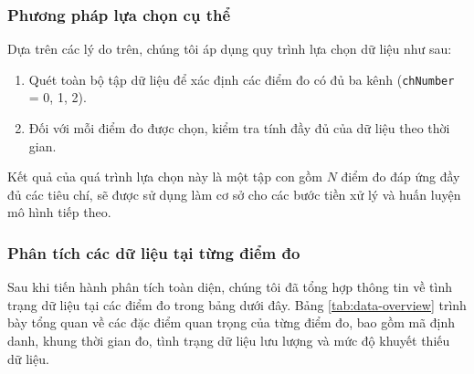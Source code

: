 \subsubsection{Phương pháp lựa chọn cụ thể}
Dựa trên các lý do trên, chúng tôi áp dụng quy trình lựa chọn dữ liệu như sau:

\begin{enumerate}
    \item Quét toàn bộ tập dữ liệu để xác định các điểm đo có đủ ba kênh (\texttt{chNumber} = 0, 1, 2).
    \item Đối với mỗi điểm đo được chọn, kiểm tra tính đầy đủ của dữ liệu theo thời gian.
\end{enumerate}

Kết quả của quá trình lựa chọn này là một tập con gồm $N$ điểm đo đáp ứng đầy đủ các tiêu chí, sẽ được sử dụng làm cơ sở cho các bước tiền xử lý và huấn luyện mô hình tiếp theo.
\subsubsection{Phân tích các dữ liệu tại từng điểm đo}
Sau khi tiến hành phân tích toàn diện, chúng tôi đã tổng hợp thông tin về tình trạng dữ liệu tại các điểm đo trong bảng dưới đây. Bảng \ref{tab:data-overview} trình bày tổng quan về các đặc điểm quan trọng của từng điểm đo, bao gồm mã định danh, khung thời gian đo, tình trạng dữ liệu lưu lượng và mức độ khuyết thiếu dữ liệu.

\begin{table}[htbp]
\centering
{}
\caption{Tổng quan đặc điểm dữ liệu tại các điểm đo}
\label{tab:data-overview}
\end{table}

